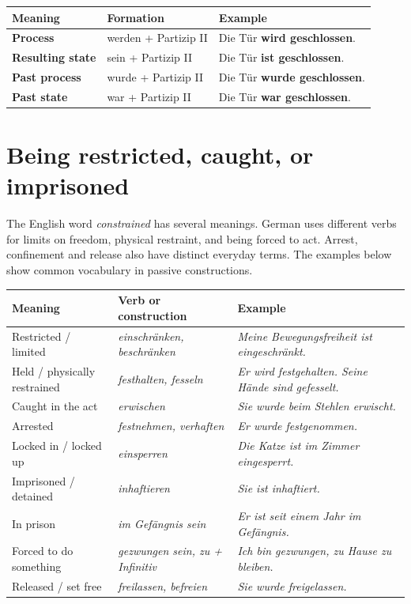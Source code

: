 \begin{center}
\small
{}
\begin{tabularx}{\textwidth}{@{}>{\bfseries}l l X@{}}
\toprule
Meaning & Formation & Example \\
\midrule
Process & werden + Partizip II & Die Tür \textbf{wird geschlossen}. \\
Resulting state & sein + Partizip II & Die Tür \textbf{ist geschlossen}. \\
Past process & wurde + Partizip II & Die Tür \textbf{wurde geschlossen}. \\
Past state & war + Partizip II & Die Tür \textbf{war geschlossen}. \\
\bottomrule
\end{tabularx}
\end{center}

\section{Being restricted, caught, or imprisoned}

The English word \textit{constrained} has several meanings. German uses
different verbs for limits on freedom, physical restraint, and being forced
to act. Arrest, confinement and release also have distinct everyday terms.
The examples below show common vocabulary in passive constructions.

\begin{center}
\small
{}
\begin{tabularx}{\textwidth}{@{}p{}p{}X@{}}
\toprule
Meaning & Verb or construction & Example \\
\midrule
Restricted / limited & \textit{einschränken, beschränken}
  & \textit{Meine Bewegungsfreiheit ist eingeschränkt.} \\
Held / physically restrained & \textit{festhalten, fesseln}
  & \textit{Er wird festgehalten. Seine Hände sind gefesselt.} \\
Caught in the act & \textit{erwischen}
  & \textit{Sie wurde beim Stehlen erwischt.} \\
Arrested & \textit{festnehmen, verhaften}
  & \textit{Er wurde festgenommen.} \\
Locked in / locked up & \textit{einsperren}
  & \textit{Die Katze ist im Zimmer eingesperrt.} \\
Imprisoned / detained & \textit{inhaftieren}
  & \textit{Sie ist inhaftiert.} \\
In prison & \textit{im Gefängnis sein}
  & \textit{Er ist seit einem Jahr im Gefängnis.} \\
Forced to do something & \textit{gezwungen sein, zu + Infinitiv}
  & \textit{Ich bin gezwungen, zu Hause zu bleiben.} \\
Released / set free & \textit{freilassen, befreien}
  & \textit{Sie wurde freigelassen.} \\
\bottomrule
\end{tabularx}
\end{center}


